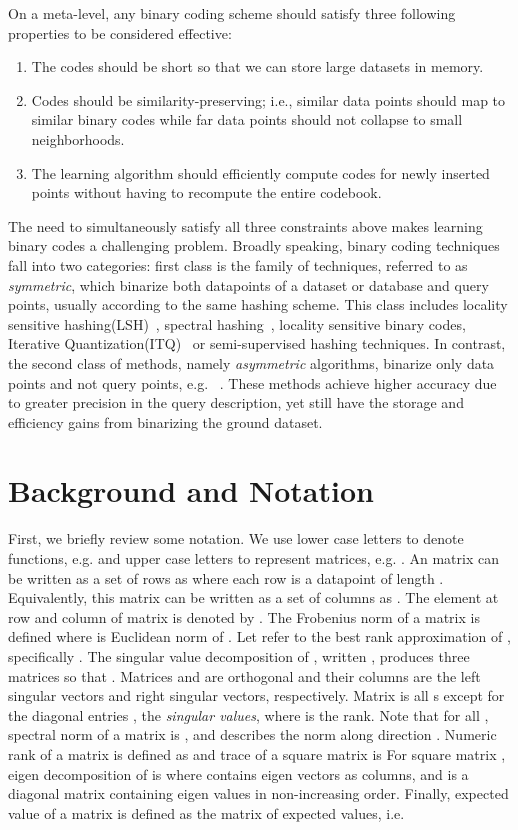 \documentclass{sig-alternate}
\begin{document}
On a meta-level, any binary coding scheme should satisfy three following properties to be considered effective: 
\begin{enumerate}
\item{The codes should be short so that we can store large datasets in memory.}
\item{Codes should be similarity-preserving; i.e., similar data points should map to similar binary codes while far data points should not collapse to small neighborhoods.}
\item{The learning algorithm should efficiently compute codes for newly inserted points without having to recompute the entire codebook.}
\end{enumerate}
The need to simultaneously satisfy all three constraints above makes learning binary codes a challenging problem.
Broadly speaking, binary coding techniques fall into two categories: first class is the family of techniques, referred to as \textit{symmetric}, which binarize both datapoints of a dataset or database and query points, usually according to the same hashing scheme. This class includes locality sensitive hashing(LSH)~\cite{indyk1998approximate}, spectral hashing~\cite{weiss2009spectral}, 
locality sensitive binary codes\cite{raginsky2009locality}, Iterative Quantization(ITQ)~\cite{gong2011iterative} or semi-supervised hashing\cite{wang2012semi} techniques.
In contrast, the second class of methods, namely \emph{asymmetric} algorithms, binarize only data points and not query points, e.g. ~\cite{jegou2011product,dong2008asymmetric,gordo2014asymmetric,jegou2010aggregating}. These methods achieve higher accuracy due to greater precision in the query description, yet still have the storage and efficiency gains from binarizing the ground dataset.

\section{Background and Notation}
First, we briefly review some notation. We use lower case letters to denote functions, e.g.  and upper case letters to represent matrices, e.g. . An  matrix  can be written as a set of  rows as  where each row  is a datapoint of length . Equivalently, this matrix can be written as a set of  columns as . The element at row  and column  of matrix  is denoted by .
The Frobenius norm of a matrix  is defined  where  is Euclidean norm of .  
Let  refer to the best rank  approximation of , specifically .  
The singular value decomposition of , written , produces three matrices  so that .  Matrices  and  are orthogonal and their columns are the left singular vectors and right singular vectors, respectively. Matrix  is all s except for the diagonal entries , the \emph{singular values}, where  is the rank.  Note that  for all , spectral norm of a matrix is , and  describes the norm along direction .  
Numeric rank of a matrix  is defined as  and trace of a square matrix  is 
For square matrix , eigen decomposition of  is  where  contains eigen vectors as columns, and  is a diagonal matrix containing eigen values  in non-increasing order. 
Finally, expected value of a matrix is defined as the matrix of expected values, i.e. 
\end{document}
